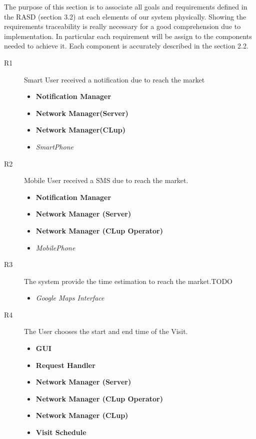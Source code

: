 The purpose of this section is to associate all goals and requirements defined in the RASD (section 3.2) at each elements of our system physically.
Showing the requirements traceability is really necessary for a good comprehension due to implementation.
In particular each requirement will be assign to the components needed to achieve it. 
Each component is accurately described in the section 2.2.


\begin{description}
   
   \item[R1] Smart User received a notification due to reach the market
    \begin{itemize}
        \item \textbf{Notification Manager}
        \item \textbf{Network Manager(Server)}
        \item \textbf{Network Manager(CLup)}
        \item \textit{SmartPhone}
    \end{itemize}
    
    \item[R2] Mobile User received a SMS due to reach the market.
        \begin{itemize}
            \item \textbf{Notification Manager}
            \item \textbf{Network Manager (Server)}
            \item \textbf{Network Manager (CLup Operator)}
            \item \textit{MobilePhone}
        \end{itemize}

    \item[R3] The system provide the time estimation to reach the market.TODO
        \begin{itemize}
            \item \textit{Google Maps Interface}
        \end{itemize}

    \item[R4] The User chooses the start and end time of the Visit.
        \begin{itemize}
            \item \textbf{GUI}
            \item \textbf{Request Handler}
            \item \textbf{Network Manager (Server)}
            \item \textbf{Network Manager (CLup Operator)}
            \item \textbf{Network Manager (CLup)}
            \item \textbf{Visit Schedule}
        \end{itemize}
   

\end{description}
